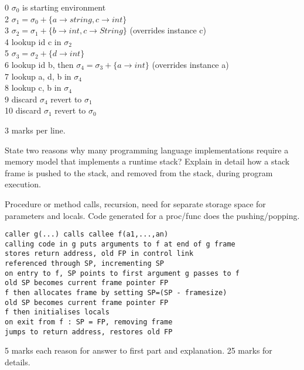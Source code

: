 \documentclass[11pt]{bareexam}
\begin{document}
\begin{questions}
\begin{subquestions}
\begin{modelanswer}
0  $\sigma_0$ is starting environment\\
2  $\sigma_1 = \sigma_0 + \{a\rightarrow string,c\rightarrow int\}$\\
3  $\sigma_2 = \sigma_1 + \{b\rightarrow int,c\rightarrow String\}$ (overrides instance c)\\
4  lookup id c  in $\sigma_2$\\
5  $\sigma_3 = \sigma_2 + \{d\rightarrow int\}$ \\
6  lookup id b, then $\sigma_4 = \sigma_3 + \{a\rightarrow int\}$ (overrides instance a)\\
7  lookup a, d, b  in $\sigma_4$\\
8  lookup c, b in $\sigma_4$\\
9  discard $\sigma_4$ revert to $\sigma_1$\\
10 discard $\sigma_1$ revert to $\sigma_0$


3 marks per line.
\end{modelanswer}


\end{subquestions}

\newpage

\question

\begin{subquestions}

\subquestion
\begin{subsubquestions}
\subsubquestion
State two reasons why many 
programming language implementations require a memory model that 
implements a runtime stack?
\subsubquestion
Explain in detail how a stack frame is pushed to the stack, and 
removed from the stack, during program execution. 
\end{subsubquestions}

\begin{modelanswer}
Procedure or method calls, recursion, need for separate storage space for
parameters and locals.
Code generated for a proc/func does the pushing/popping.
\begin{verbatim}
caller g(...) calls callee f(a1,...,an)
calling code in g puts arguments to f at end of g frame
stores return address, old FP in control link
referenced through SP, incrementing SP
on entry to f, SP points to first argument g passes to f
old SP becomes current frame pointer FP
f then allocates frame by setting SP=(SP - framesize)
old SP becomes current frame pointer FP
f then initialises locals
on exit from f : SP = FP, removing frame
jumps to return address, restores old FP
\end{verbatim}
5 marks each reason
for answer to first part and explanation. 
25 marks for details.
\end{modelanswer}


\end{subquestions}
\end{questions}
\end{document}
